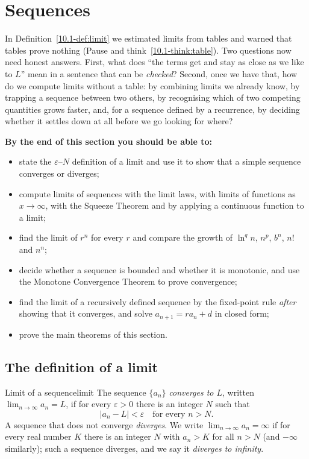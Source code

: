 \documentclass[11pt]{article}
\begin{document}
\section{Sequences}

\begin{guide}
In Definition~\ref{10.1-def:limit} we estimated limits from tables and warned that tables prove nothing (Pause and think~\ref{10.1-think:table}). Two questions now need honest answers. First, what does ``the terms get and stay as close as we like to $L$'' mean in a sentence that can be \emph{checked}? Second, once we have that, how do we compute limits without a table: by combining limits we already know, by trapping a sequence between two others, by recognising which of two competing quantities grows faster, and, for a sequence defined by a recurrence, by deciding whether it settles down at all before we go looking for where?
\end{guide}

\textbf{By the end of this section you should be able to:}
\begin{itemize}
  \item state the $\varepsilon$--$N$ definition of a limit and use it to show that a simple sequence converges or diverges;
  \item compute limits of sequences with the limit laws, with limits of functions as $x\to\infty$, with the Squeeze Theorem and by applying a continuous function to a limit;
  \item find the limit of $r^n$ for every $r$ and compare the growth of $\ln^q n$, $n^p$, $b^n$, $n!$ and $n^n$;
  \item decide whether a sequence is bounded and whether it is monotonic, and use the Monotone Convergence Theorem to prove convergence;
  \item find the limit of a recursively defined sequence by the fixed-point rule \emph{after} showing that it converges, and solve $a_{n+1}=ra_n+d$ in closed form;
  \item prove the main theorems of this section.
\end{itemize}

\subsection*{The definition of a limit}

\begin{defn}{Limit of a sequence}{limit}
The sequence $\{a_n\}$ \emph{converges to $L$}, written $\lim_{n\to\infty}a_n=L$, if for every $\varepsilon>0$ there is an integer $N$ such that
\[
|a_n-L|<\varepsilon\quad\text{for every } n>N.
\]
A sequence that does not converge \emph{diverges}. We write $\lim_{n\to\infty}a_n=\infty$ if for every real number $K$ there is an integer $N$ with $a_n>K$ for all $n>N$ (and $-\infty$ similarly); such a sequence diverges, and we say it \emph{diverges to infinity}.
\end{defn}
\end{document}
